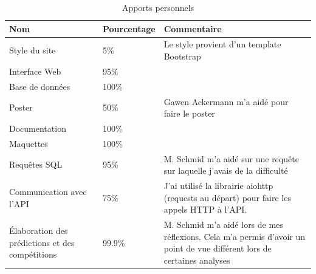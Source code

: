 \documentclass[a4paper,14pt]{extarticle}
\begin{document}
{\begin{table}[htp]
    \centering
    \begin{tabular}{|m{4cm}|m{4cm}|m{6cm}|}
    \hline
    \textbf{Nom}                                    & \textbf{Pourcentage} & \textbf{Commentaire}                                                                                                    \\ \hline
        Style du site                                   & 5\%                  & Le style provient d'un template Bootstrap                                                                               \\ \hline
        Interface Web                                   & 95\%                 &                                                                                                                         \\ \hline
        Base de données                                 & 100\%                &                                                                                                                         \\ \hline
        Poster                                          & 50\%                 & Gawen Ackermann m'a aidé pour faire le poster                                                                           \\ \hline
        Documentation                                   & 100\%                &                                                                                                                         \\ \hline
        Maquettes                                       & 100\%                &                                                                                                                         \\ \hline
        Requêtes SQL                                    & 95\%                 & M. Schmid m'a aidé sur une requête sur laquelle j'avais de la difficulté                                                \\ \hline
        Communication avec l'API                        & 75\%                 & J'ai utilisé la librairie aiohttp (requests au départ) pour faire les appels HTTP à l'API.                              \\ \hline
        Élaboration des prédictions et des compétitions & 99.9\%               & M. Schmid m'a aidé lors de mes réflexions. Cela m'a permis d'avoir un point de vue différent lors de certaines analyses \\ \hline
    \end{tabular}
    \caption{Apports personnels}
    \label{tab:apportsPersonnels}
\end{table}

}
\end{document}
